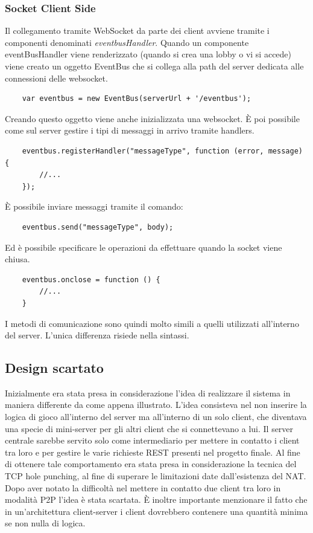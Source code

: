 \subsubsection{Socket Client Side}
Il collegamento tramite WebSocket da parte dei client avviene tramite i componenti denominati \textit{eventbusHandler}.\newline
Quando un componente eventBusHandler viene renderizzato (quando si crea una lobby o vi si accede) viene creato un oggetto EventBus che si collega alla path del server dedicata alle connessioni delle websocket.
\begin{verbatim}
    var eventbus = new EventBus(serverUrl + '/eventbus');
\end{verbatim}
Creando questo oggetto viene anche inizializzata una websocket. È poi possibile come sul server gestire i tipi di messaggi in arrivo tramite handlers.
\begin{verbatim}
    eventbus.registerHandler("messageType", function (error, message) {
        //...
    });
\end{verbatim}
È possibile inviare messaggi tramite il comando:
\begin{verbatim}
    eventbus.send("messageType", body);
\end{verbatim}
Ed è possibile specificare le operazioni da effettuare quando la socket viene chiusa.
\begin{verbatim}
    eventbus.onclose = function () {
        //...
    }
\end{verbatim}
I metodi di comunicazione sono quindi molto simili a quelli utilizzati all'interno del server. L'unica differenza risiede nella sintassi.

\subsection{Design scartato}
Inizialmente era stata presa in considerazione l'idea di realizzare il sistema in maniera differente da come appena illustrato.\newline
L'idea consisteva nel non inserire la logica di gioco all'interno del server ma all'interno di un solo client, che diventava una specie di mini-server per gli altri client che si connettevano a lui.\newline
Il server centrale sarebbe servito solo come intermediario per mettere in contatto i client tra loro e per gestire le varie richieste REST presenti nel progetto finale.\newline
Al fine di ottenere tale comportamento era stata presa in considerazione la tecnica del TCP hole punching, al fine di superare le limitazioni date dall'esistenza del NAT.\newline
Dopo aver notato la difficoltà nel mettere in contatto due client tra loro in modalità P2P l'idea è stata scartata.\newline
È inoltre importante menzionare il fatto che in un'architettura client-server i client dovrebbero contenere una quantità minima se non nulla di logica.
\newpage
